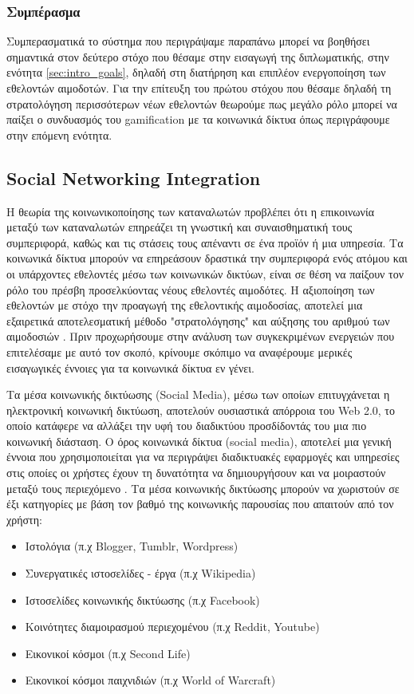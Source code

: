 	\subsubsection{Συμπέρασμα}
	
	Συμπερασματικά το σύστημα που περιγράψαμε παραπάνω μπορεί να βοηθήσει σημαντικά στον δεύτερο στόχο που θέσαμε στην εισαγωγή της διπλωματικής, στην ενότητα \ref{sec:intro_goals}, δηλαδή στη διατήρηση και επιπλέον ενεργοποίηση των εθελοντών αιμοδοτών. Για την επίτευξη του πρώτου στόχου που θέσαμε δηλαδή τη στρατολόγηση περισσότερων νέων εθελοντών θεωρούμε πως μεγάλο ρόλο μπορεί να παίξει ο συνδυασμός του gamification με τα κοινωνικά δίκτυα όπως περιγράφουμε στην επόμενη ενότητα.
	
	\subsection{Social Networking Integration}\label{ssec:social_netowrks_system_analysis}

	Η θεωρία της κοινωνικοποίησης των καταναλωτών προβλέπει ότι η επικοινωνία μεταξύ των καταναλωτών επηρεάζει τη γνωστική και συναισθηματική τους συμπεριφορά, καθώς και τις στάσεις τους απέναντι σε ένα προϊόν ή μια υπηρεσία\cite{1974}. Τα κοινωνικά δίκτυα μπορούν να επηρεάσουν δραστικά την συμπεριφορά ενός ατόμου\cite{shaver2007impact} και οι υπάρχοντες εθελοντές μέσω των κοινωνικών δικτύων, είναι σε θέση να παίξουν τον ρόλο του πρέσβη προσελκύοντας νέους εθελοντές αιμοδότες. Η αξιοποίηση των εθελοντών με στόχο την προαγωγή της εθελοντικής αιμοδοσίας, αποτελεί μια εξαιρετικά αποτελεσματική μέθοδο "στρατολόγησης" και αύξησης του αριθμού των αιμοδοσιών \cite{Lemmens2008}. Πριν προχωρήσουμε στην ανάλυση των συγκεκριμένων ενεργειών που επιτελέσαμε με αυτό τον σκοπό, κρίνουμε σκόπιμο να αναφέρουμε μερικές εισαγωγικές έννοιες για τα κοινωνικά δίκτυα εν γένει. 	
	
	Τα μέσα κοινωνικής δικτύωσης (Social Media), μέσω των οποίων επιτυγχάνεται η ηλεκτρονική κοινωνική δικτύωση, αποτελούν ουσιαστικά απόρροια του Web 2.0, το οποίο κατάφερε να αλλάξει την υφή του διαδικτύου προσδίδοντάς του μια πιο κοινωνική διάσταση. Ο όρος κοινωνικά δίκτυα (social media), αποτελεί μια γενική έννοια που χρησιμοποιείται για να περιγράψει διαδικτυακές εφαρμογές και υπηρεσίες στις οποίες οι χρήστες έχουν τη δυνατότητα να δημιουργήσουν και να μοιραστούν μεταξύ τους περιεχόμενο \cite{Kaplan201059}. Τα μέσα κοινωνικής δικτύωσης μπορούν να χωριστούν σε έξι κατηγορίες με βάση τον βαθμό της κοινωνικής παρουσίας που απαιτούν από τον χρήστη:
	\begin{itemize}
		\item Ιστολόγια (π.χ Blogger, Tumblr, Wordpress)
		\item Συνεργατικές ιστοσελίδες - έργα (π.χ Wikipedia)
		\item Ιστοσελίδες κοινωνικής δικτύωσης (π.χ Facebook)
		\item Κοινότητες διαμοιρασμού περιεχομένου (π.χ Reddit, Youtube)
		\item Εικονικοί κόσμοι (π.χ Second Life)
		\item Εικονικοί κόσμοι παιχνιδιών (π.χ World of Warcraft)
	\end{itemize}
	

